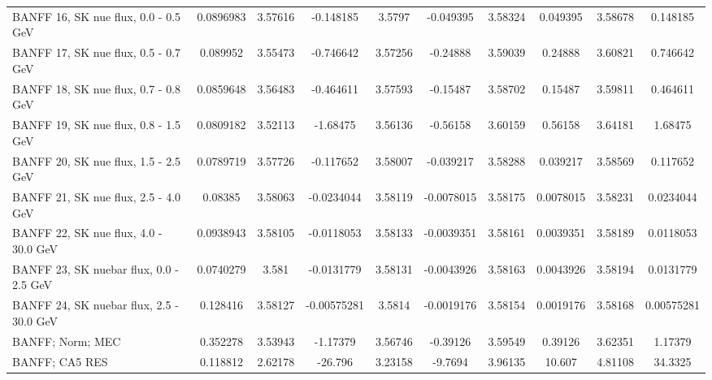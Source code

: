 {\begin{landscape}
\begin{table}
{\begin{tabular}{| l | S | S  S | S  S | S  S | S  S | }
      BANFF 16, SK nue flux, 0.0 - 0.5 GeV      &       0.0896983 &         3.57616 &       -0.148185 &          3.5797 &       -0.049395 &         3.58324 &        0.049395 &         3.58678 &        0.148185 \\ 
      BANFF 17, SK nue flux, 0.5 - 0.7 GeV      &        0.089952 &         3.55473 &       -0.746642 &         3.57256 &        -0.24888 &         3.59039 &         0.24888 &         3.60821 &        0.746642 \\ 
      BANFF 18, SK nue flux, 0.7 - 0.8 GeV      &       0.0859648 &         3.56483 &       -0.464611 &         3.57593 &        -0.15487 &         3.58702 &         0.15487 &         3.59811 &        0.464611 \\ 
      BANFF 19, SK nue flux, 0.8 - 1.5 GeV      &       0.0809182 &         3.52113 &        -1.68475 &         3.56136 &        -0.56158 &         3.60159 &         0.56158 &         3.64181 &         1.68475 \\ 
      BANFF 20, SK nue flux, 1.5 - 2.5 GeV      &       0.0789719 &         3.57726 &       -0.117652 &         3.58007 &       -0.039217 &         3.58288 &        0.039217 &         3.58569 &        0.117652 \\ 
      BANFF 21, SK nue flux, 2.5 - 4.0 GeV      &         0.08385 &         3.58063 &      -0.0234044 &         3.58119 &      -0.0078015 &         3.58175 &       0.0078015 &         3.58231 &       0.0234044 \\ 
      BANFF 22, SK nue flux, 4.0 - 30.0 GeV     &       0.0938943 &         3.58105 &      -0.0118053 &         3.58133 &      -0.0039351 &         3.58161 &       0.0039351 &         3.58189 &       0.0118053 \\ 
      BANFF 23, SK nuebar flux, 0.0 - 2.5 GeV   &       0.0740279 &           3.581 &      -0.0131779 &         3.58131 &      -0.0043926 &         3.58163 &       0.0043926 &         3.58194 &       0.0131779 \\ 
      BANFF 24, SK nuebar flux, 2.5 - 30.0 GeV  &        0.128416 &         3.58127 &     -0.00575281 &          3.5814 &      -0.0019176 &         3.58154 &       0.0019176 &         3.58168 &      0.00575281 \\ 
      BANFF; Norm; MEC               &        0.352278 &         3.53943 &        -1.17379 &         3.56746 &        -0.39126 &         3.59549 &         0.39126 &         3.62351 &         1.17379 \\ 
      BANFF; CA5 RES                 &        0.118812 &         2.62178 &         -26.796 &         3.23158 &         -9.7694 &         3.96135 &          10.607 &         4.81108 &         34.3325 \\ 

\end{tabular}}
\end{table}
\end{landscape}}
